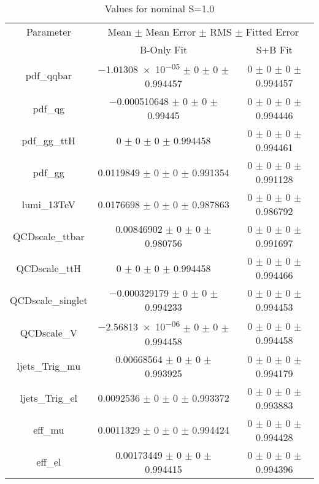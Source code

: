 \begin{table}
\centering
\caption{Values for nominal S=1.0}
\begin{tabular}{ccc}
\toprule
Parameter 	& \multicolumn{2}{c}{Mean $\pm$ Mean Error $\pm$ RMS $\pm$ Fitted Error}\\
 	& B-Only Fit & S+B Fit\\
\midrule
pdf\_qqbar 	& \num{-1.01308e-05} $\pm$ \num{0} $\pm$ \num{0} $\pm$ \num{0.994457} 	& \num{0} $\pm$ \num{0} $\pm$ \num{0} $\pm$ \num{0.994457}\\
pdf\_qg 	& \num{-0.000510648} $\pm$ \num{0} $\pm$ \num{0} $\pm$ \num{0.99445} 	& \num{0} $\pm$ \num{0} $\pm$ \num{0} $\pm$ \num{0.994446}\\
pdf\_gg\_ttH 	& \num{0} $\pm$ \num{0} $\pm$ \num{0} $\pm$ \num{0.994458} 	& \num{0} $\pm$ \num{0} $\pm$ \num{0} $\pm$ \num{0.994461}\\
pdf\_gg 	& \num{0.0119849} $\pm$ \num{0} $\pm$ \num{0} $\pm$ \num{0.991354} 	& \num{0} $\pm$ \num{0} $\pm$ \num{0} $\pm$ \num{0.991128}\\
lumi\_13TeV 	& \num{0.0176698} $\pm$ \num{0} $\pm$ \num{0} $\pm$ \num{0.987863} 	& \num{0} $\pm$ \num{0} $\pm$ \num{0} $\pm$ \num{0.986792}\\
QCDscale\_ttbar 	& \num{0.00846902} $\pm$ \num{0} $\pm$ \num{0} $\pm$ \num{0.980756} 	& \num{0} $\pm$ \num{0} $\pm$ \num{0} $\pm$ \num{0.991697}\\
QCDscale\_ttH 	& \num{0} $\pm$ \num{0} $\pm$ \num{0} $\pm$ \num{0.994458} 	& \num{0} $\pm$ \num{0} $\pm$ \num{0} $\pm$ \num{0.994466}\\
QCDscale\_singlet 	& \num{-0.000329179} $\pm$ \num{0} $\pm$ \num{0} $\pm$ \num{0.994233} 	& \num{0} $\pm$ \num{0} $\pm$ \num{0} $\pm$ \num{0.994453}\\
QCDscale\_V 	& \num{-2.56813e-06} $\pm$ \num{0} $\pm$ \num{0} $\pm$ \num{0.994458} 	& \num{0} $\pm$ \num{0} $\pm$ \num{0} $\pm$ \num{0.994458}\\
ljets\_Trig\_mu 	& \num{0.00668564} $\pm$ \num{0} $\pm$ \num{0} $\pm$ \num{0.993925} 	& \num{0} $\pm$ \num{0} $\pm$ \num{0} $\pm$ \num{0.994179}\\
ljets\_Trig\_el 	& \num{0.0092536} $\pm$ \num{0} $\pm$ \num{0} $\pm$ \num{0.993372} 	& \num{0} $\pm$ \num{0} $\pm$ \num{0} $\pm$ \num{0.993883}\\
eff\_mu 	& \num{0.0011329} $\pm$ \num{0} $\pm$ \num{0} $\pm$ \num{0.994424} 	& \num{0} $\pm$ \num{0} $\pm$ \num{0} $\pm$ \num{0.994428}\\
eff\_el 	& \num{0.00173449} $\pm$ \num{0} $\pm$ \num{0} $\pm$ \num{0.994415} 	& \num{0} $\pm$ \num{0} $\pm$ \num{0} $\pm$ \num{0.994396}\\

\end{tabular}
\end{table}
